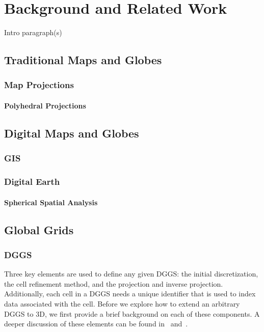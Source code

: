 \chapter{Background and Related Work} \label{chap:background}

Intro paragraph(s)

\section{Traditional Maps and Globes}

\subsection{Map Projections}

\subsubsection{Polyhedral Projections}




\section{Digital Maps and Globes}

\subsection{GIS}

\subsection{Digital Earth}

\subsubsection{Spherical Spatial Analysis}




\section{Global Grids}

\subsection{DGGS} \label{sec:dggs}
Three key elements are used to define any given DGGS: the initial discretization, the cell refinement method, and the projection and inverse projection.
Additionally, each cell in a DGGS needs a unique identifier that is used to index data associated with the cell.
Before we explore how to extend an arbitrary DGGS to 3D, we first provide a brief background on each of these components.
A deeper discussion of these elements can be found in~\cite{mahdavi2015survey} and~\cite{alderson2020digital}.


